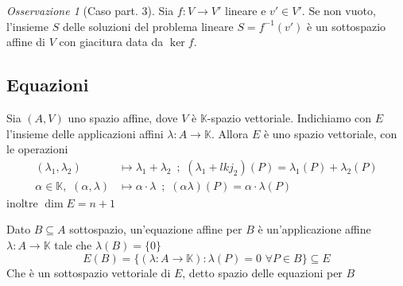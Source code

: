 \documentclass{article}
\newcounter{theo}[section]\setcounter{theo}{0}
\theoremstyle{plain}
\theoremstyle{definition}
\theoremstyle{remark}
\newtheorem*{remark}{Osservazione}
\begin{document}
\begin{remark}[Caso part. 3]
    Sia \(f : V \to V'\) lineare e \(v' \in V'\).
    Se non vuoto, l'insieme \(S\)  delle soluzioni del problema lineare \(S =
    f^{-1}(v')\) è un sottospazio affine di \(V\) con giacitura data da \(\ker
    f\).
\end{remark}

\subsection{Equazioni}
Sia \((A, V)\) uno spazio affine, dove \(V\) è \(\mathbb{K}\)-spazio vettoriale.
Indichiamo con \(E\) l'insieme delle applicazioni affini \(\lambda : A \to
\mathbb{K}\). Allora \(E\) è uno spazio vettoriale, con le operazioni
\begin{align*}
    (\lambda_{1}, \lambda_{2}) &\mapsto \lambda_{1} + \lambda_{2}\,\,\,;\,\,
    (\lambda_{1} + lkj_{2})(P) = \lambda_{1}(P) + \lambda_{2}(P) \\
    \alpha \in \mathbb{K},\,\,(\alpha, \lambda) &\mapsto \alpha\cdot \lambda\,\,\,;\,\,(\alpha \lambda)(P) =
    \alpha \cdot \lambda(P)
\end{align*}
inoltre \(\dim E = n+1\) 

Dato \(B \subseteq A \) sottospazio, un'equazione affine per \(B\) è
un'applicazione affine \(\lambda: A \to \mathbb{K}\) tale che \(\lambda(B) = \{0\} \) 
\[
    E(B) = \{(\lambda : A \to \mathbb{K}) : \lambda(P) = 0 \,\, \forall P \in
    B\}  \subseteq E 
\]
Che è un sottospazio vettoriale di \(E\), detto spazio delle equazioni per \(B\) 
\end{document}
